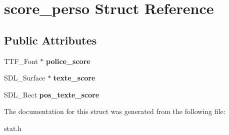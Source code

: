 \hypertarget{structscore__perso}{}\section{score\+\_\+perso Struct Reference}
\label{structscore__perso}
\subsection*{Public Attributes}
\begin{DoxyCompactItemize}
\item 
\mbox{\label{structscore__perso_a7bdcd5e9dfad29e5043e082b1639819c}} 
T\+T\+F\+\_\+\+Font $\ast$ {\bfseries police\+\_\+score}
\item 
\mbox{\label{structscore__perso_a746add510ddf10a1ac7e985e2ae73036}} 
S\+D\+L\+\_\+\+Surface $\ast$ {\bfseries texte\+\_\+score}
\item 
\mbox{\label{structscore__perso_a1395bca9a5dbb6b447d88d54003eac53}} 
S\+D\+L\+\_\+\+Rect {\bfseries pos\+\_\+texte\+\_\+score}
\end{DoxyCompactItemize}


The documentation for this struct was generated from the following file\+:\begin{DoxyCompactItemize}
\item 
stat.\+h\end{DoxyCompactItemize}
